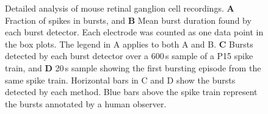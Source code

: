 \documentclass[12pt, titlepage]{article}
\begin{document}
		\begin{figure}[h]
			\centering
			\caption{Detailed analysis of mouse retinal ganglion cell recordings. \textbf{A} Fraction of spikes in bursts, and \textbf{B} Mean burst duration found by each burst detector. Each electrode was counted as one data point in the box plots. The legend in A applies to both A and B. \textbf{C} Bursts detected by each burst detector over a 600$\,$s sample of a P15 spike train, and \textbf{D} 20$\,$s sample showing the first bursting episode from the same spike train. Horizontal bars in C and D show the bursts detected by each method. Blue bars above the spike train represent the bursts annotated by a human observer.  }
			\label{RGC_results}
		\end{figure}
\end{document}
